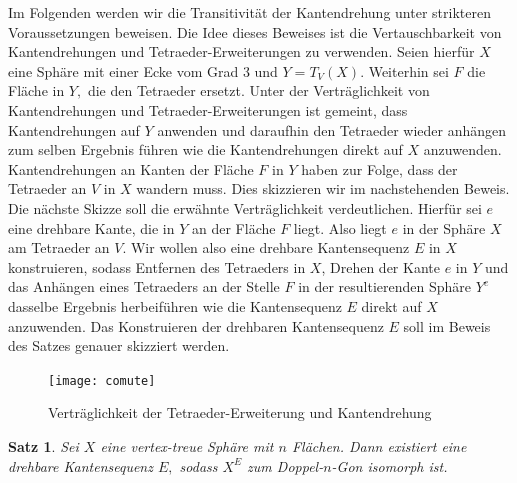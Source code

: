 \documentclass[12pt,titlepage,twoside,cleardoublepage]{article}
\theoremstyle{nummermitklammern}
\newtheorem{satz}[temp]{Satz}
\newtheorem{satz}[zahl]{Satz}
\numberwithin{equation}{section}
\begin{document}
Im Folgenden werden wir die Transitivität der Kantendrehung unter strikteren Voraussetzungen beweisen. Die Idee dieses Beweises ist die Vertauschbarkeit von Kantendrehungen und Tetraeder-Erweiterungen zu verwenden. Seien hierfür $X$ eine Sphäre mit einer Ecke vom Grad 3 und $Y=T_V(X)$. Weiterhin sei $F$ die Fläche in $Y,$ die den Tetraeder ersetzt. Unter der Verträglichkeit von Kantendrehungen und Tetraeder-Erweiterungen ist gemeint, dass Kantendrehungen auf $Y$ anwenden und daraufhin den Tetraeder wieder anhängen zum selben Ergebnis führen wie die Kantendrehungen direkt auf $X$ anzuwenden. Kantendrehungen an Kanten der Fläche $F$ in $Y$ haben zur Folge, dass der Tetraeder an $V$ in $X$ wandern muss. Dies skizzieren wir im nachstehenden Beweis. Die nächste Skizze soll die erwähnte Verträglichkeit verdeutlichen. Hierfür sei $e$ eine drehbare Kante, die in $Y$ an der Fläche $F$ liegt. Also liegt $e$ in der Sphäre $X$ am Tetraeder an $V$. Wir wollen also eine drehbare Kantensequenz $E$ in $X$ konstruieren, sodass Entfernen des Tetraeders in $X$, Drehen der Kante $e$ in $Y$ und das Anhängen eines Tetraeders an der Stelle $F$ in der resultierenden Sphäre $Y^e$ dasselbe Ergebnis herbeiführen wie die Kantensequenz $E$ direkt auf $X$ anzuwenden. Das Konstruieren der drehbaren Kantensequenz $E$ soll im Beweis des Satzes genauer skizziert werden.
\begin{center}
\begin{figure}[H]
\texttt{[image: comute]}
\caption{Verträglichkeit der Tetraeder-Erweiterung und Kantendrehung}
\end{figure}
\end{center}
\begin{satz}\label{3eck}
Sei $X$ eine vertex-treue Sphäre mit $n$ Flächen. Dann existiert eine drehbare Kantensequenz $E,$ sodass $X^E$ zum Doppel-$n$-Gon isomorph ist. 
\end{satz}
\end{document}

